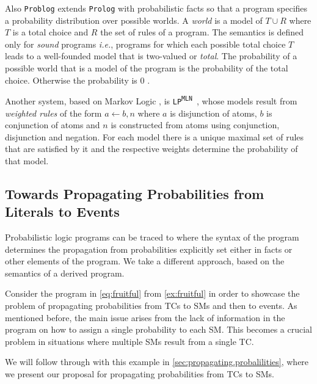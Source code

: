 \documentclass{tlp}
\renewcommand{\cite}{\citep}
\newcommand{\clause}{\ensuremath{\leftarrow}}
\newcommand{\lpmln}{\texttt{LP\textsuperscript{MLN}}}
\begin{document}
Also \texttt{Problog} \cite{fierens2015inference,verreet2022inference}
extends \texttt{Prolog} with probabilistic facts so that a program
specifies a probability distribution over possible worlds.  A
\textit{world} is a model of \(T \cup R\) where \(T\) is a total
choice and \(R\) the set of rules of a program.  The semantics is
defined only for \textit{sound} programs \cite{riguzzi2013well}
\textit{i.e.}, programs for which each possible total choice \(T\)
leads to a well-founded model that is two-valued or \textit{total}.
The probability of a possible world that is a model of the program is
the probability of the total choice.  Otherwise the probability is
\(0\) \cite{riguzzi2013well,van1991well}.

Another system, based on Markov Logic \cite{richardson2006markov}, is
\lpmln\ \cite{lee2016weighted,lee2017lpmln}, whose models result from
\textit{weighted rules} of the form \(a \clause b, n\) where \(a\)
is disjunction of atoms, \(b\) is conjunction of atoms and \(n\) is
constructed from atoms using conjunction, disjunction and negation.
For each model there is a unique maximal set of rules that are
satisfied by it and the respective weights determine the probability
of that model.


\subsection*{Towards Propagating Probabilities from Literals to Events}
\label{sec:example.1}

Probabilistic logic programs can be traced to \cite{kifer1992theory}
where the syntax of the program determines the propagation from
probabilities explicitly set either in facts or other elements of the
program.  We take a different approach, based on the semantics of a
derived program.

Consider the program in \cref{eq:fruitful} from \cref{ex:fruitful} in
order to showcase the problem of propagating probabilities from
\aclp{TC} to \aclp{SM} and then to events.  As mentioned before, the
main issue arises from the lack of information in the program on how
to assign a single probability to each \acl{SM}.  This becomes a
crucial problem in situations where multiple \aclp{SM} result from a
single \acl{TC}.

We will follow through with this example in
\cref{sec:propagating.probalilities}, where we present our proposal
for propagating probabilities from \aclp{TC} to \aclp{SM}.
\end{document}
